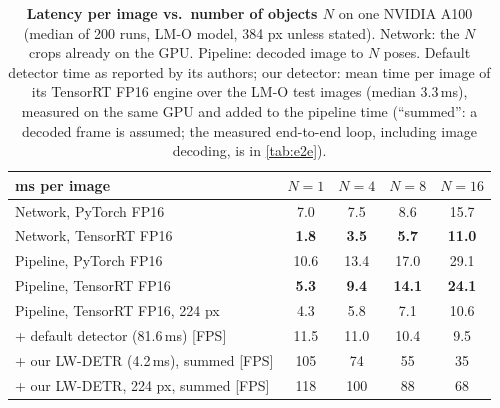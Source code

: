 \begin{table}[t]
  \centering
  \setlength{\tabcolsep}{4pt}
  \small
  \begin{tabular}{lcccc}
    \toprule
    ms per image & $N{=}1$ & $N{=}4$ & $N{=}8$ & $N{=}16$ \\
    \midrule
    Network, PyTorch FP16 & 7.0 & 7.5 & 8.6 & 15.7 \\
    Network, TensorRT FP16 & \textbf{1.8} & \textbf{3.5} & \textbf{5.7} & \textbf{11.0} \\
    Pipeline, PyTorch FP16 & 10.6 & 13.4 & 17.0 & 29.1 \\
    Pipeline, TensorRT FP16 & \textbf{5.3} & \textbf{9.4} & \textbf{14.1} & \textbf{24.1} \\
    Pipeline, TensorRT FP16, 224 px & 4.3 & 5.8 & 7.1 & 10.6 \\
    \midrule
    + default detector (81.6\,ms) [FPS] & 11.5 & 11.0 & 10.4 & 9.5 \\
    + our LW-DETR (4.2\,ms), summed [FPS] & 105 & 74 & 55 & 35 \\
    + our LW-DETR, 224 px, summed [FPS] & 118 & 100 & 88 & 68 \\
    \bottomrule
  \end{tabular}
  \caption{\textbf{Latency per image vs.\ number of objects $N$} on one NVIDIA A100 (median of
  200 runs, LM-O model, 384 px unless stated). Network: the $N$ crops already on the GPU. Pipeline:
  decoded image to $N$ poses. Default detector time as reported by its authors; our detector:
  mean time per image of its TensorRT FP16 engine over the LM-O test images (median 3.3\,ms),
  measured on the same GPU and added to the pipeline time (``summed'': a decoded frame is
  assumed; the measured end-to-end loop, including image decoding, is in
  \cref{tab:e2e}).}
  \label{tab:latency}
\end{table}

